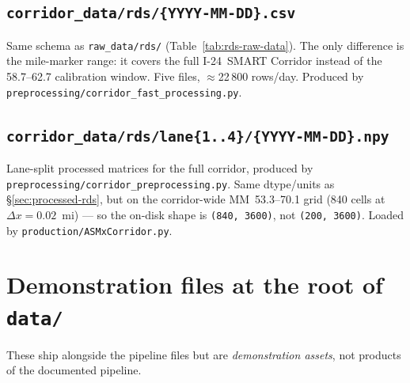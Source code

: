 \documentclass[11pt]{article}
\newcommand{\code}[1]{\texttt{#1}}
\newcommand{\filename}[1]{\textcolor{accent}{\code{#1}}}
\begin{document}
\subsection{\filename{corridor\_data/rds/\{YYYY-MM-DD\}.csv}}
Same schema as \code{raw\_data/rds/} (Table~\ref{tab:rds-raw-data}). The
only difference is the mile-marker range: it covers the full I-24~SMART
Corridor instead of the 58.7--62.7 calibration window. Five files,
$\approx$22\,800 rows/day. Produced by
\filename{preprocessing/corridor\_fast\_processing.py}.

\subsection{\filename{corridor\_data/rds/lane\{1..4\}/\{YYYY-MM-DD\}.npy}}
\begin{sloppypar}
Lane-split processed matrices for the full corridor, produced by
\filename{preprocessing/corridor\_preprocessing.py}. Same dtype/units as
\S\ref{sec:processed-rds}, but on the corridor-wide MM~53.3--70.1 grid (840
cells at $\Delta x = 0.02$~mi) --- so the on-disk shape is
\code{(840, 3600)}, not \code{(200, 3600)}. Loaded by
\filename{production/ASMxCorridor.py}.
\end{sloppypar}

\section{Demonstration files at the root of \texttt{data/}}
\label{sec:demo}

These ship alongside the pipeline files but are \emph{demonstration assets},
not products of the documented pipeline.
\end{document}
